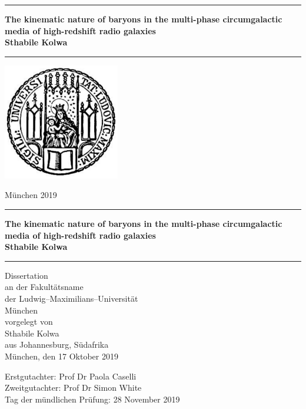 \documentclass[12pt]{book}
\newcommand{\LMUTitle}[9]{
  \thispagestyle{empty}
  \vspace*{\stretch{1}}
  {\parindent0cm
   \rule{\linewidth}{.7ex}}
  \begin{flushright}

    \vspace*{\stretch{1}}
    \sffamily\bfseries\Huge
    #1\\
    \vspace*{\stretch{1}}
    \sffamily\bfseries\large
    #2
    \vspace*{\stretch{1}}
  \end{flushright}
  \rule{\linewidth}{.7ex}
  \vspace*{\stretch{5}}
  \begin{center}
    \includegraphics[width=2in]{siegel}
  \end{center}
  \vspace*{\stretch{1}}
  \begin{center}\sffamily\LARGE{#5}\end{center}
  \newpage
  \thispagestyle{empty}

  \cleardoublepage
  \thispagestyle{empty}

  \vspace*{\stretch{1}}
  {\parindent0cm
  \rule{\linewidth}{.7ex}}
  \begin{flushright}
    \vspace*{\stretch{1}}
    \sffamily\bfseries\Huge
    #1\\
    \vspace*{\stretch{1}}
    \sffamily\bfseries\large
    #2
    \vspace*{\stretch{1}}
  \end{flushright}
  \rule{\linewidth}{.7ex}

  \vspace*{\stretch{3}}
  \begin{center}
    \Large Dissertation\\
    \Large an der #4\\
    \Large der Ludwig--Maximilians--Universit\"at\\
    \Large M\"unchen\\
    \vspace*{\stretch{1}}
    \Large vorgelegt von\\
    \Large #2\\
    \Large aus #3\\
    \vspace*{\stretch{2}}
    \Large M\"unchen, den #6
  \end{center}

  \newpage
  \thispagestyle{empty}

  \vspace*{\stretch{1}}

  \begin{flushleft}
    \large Erstgutachter:  #7 \\[1mm]
    \large Zweitgutachter: #8 \\[1mm]
    \large Tag der m\"undlichen Pr\"ufung: #9\\
  \end{flushleft}

  \cleardoublepage
}
\begin{document}
  \frontmatter


  \LMUTitle
      {The kinematic nature of baryons in the multi-phase circumgalactic media of high-redshift radio galaxies}               				%
      {Sthabile Kolwa}                       				%
      {Johannesburg, S\"udafrika}           	%
      {Fakult\"atsname}                         		%
      {M\"unchen 2019}                          		%
      {17 Oktober 2019}                            		%
      {Prof Dr Paola Caselli}                        %
      {Prof Dr Simon White}                        %
      {28 November 2019}                         						%


  \tableofcontents
 
  \listoffigures

  \listoftables
  \cleardoublepage
  
  
  
  \cleardoublepage
  

  \mainmatter\setcounter{page}{1}
  
  
  
  
  
  

  \backmatter
  
  \markboth{}{}

  \cleardoublepage
  
  
\end{document}
